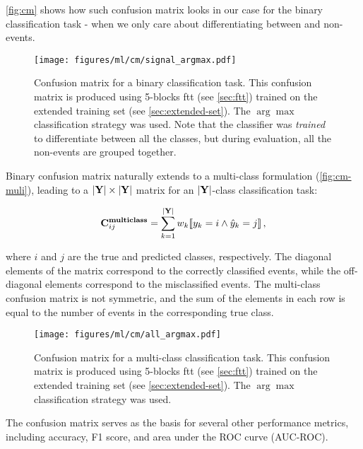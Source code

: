 \autoref{fig:cm} shows how such confusion matrix looks in our case for the binary classification task - when we only
care about differentiating between \tth and non-\tth events.

\begin{figure}[htb]
    \centering
    \texttt{[image: figures/ml/cm/signal\_argmax.pdf]}
    \caption[Confusion matrix for a binary classification task]
    {Confusion matrix for a binary classification task. This confusion matrix is produced using 5-blocks
        \gls{ftt} (see \autoref{sec:ftt}) trained on the extended training set (see \autoref{sec:extended-set}). The
        $\arg\max$ classification strategy was used.  Note that the classifier was \emph{trained} to differentiate
        between all the classes, but during evaluation, all the non-\tth events are grouped together.}
    \label{fig:cm}
\end{figure}

Binary confusion matrix naturally extends to a multi-class formulation (\autoref{fig:cm-muli}), leading to a
$|\textbf{Y}| \times |\textbf{Y}|$ matrix for an $|\textbf{Y}|$-class classification task:

\begin{equation}
    \mathbf{C}^{\textbf{multiclass}}_{ij} = \sum_{k=1}^{|\textbf{Y}|} w_k \llbracket y_k = i \land \hat{y}_k = j \rrbracket\,,
\end{equation}

where $i$ and $j$ are the true and predicted classes, respectively. The diagonal elements of the matrix correspond to
the correctly classified events, while the off-diagonal elements correspond to the misclassified events. The
multi-class confusion matrix is not symmetric, and the sum of the elements in each row is equal to the number of events
in the corresponding true class.

\begin{figure}[htb]
    \centering
    \texttt{[image: figures/ml/cm/all\_argmax.pdf]}
    \caption[Confusion matrix for a multi-class classification task]
    {Confusion matrix for a multi-class classification task. This confusion matrix is produced using 5-blocks
        \gls{ftt} (see \autoref{sec:ftt}) trained on the extended training set (see \autoref{sec:extended-set}). The
        $\arg\max$ classification strategy was used.}
    \label{fig:cm-muli}
\end{figure}

The confusion matrix serves as the basis for several other performance metrics, including accuracy, F1 score, and area
under the ROC curve (AUC-ROC).

